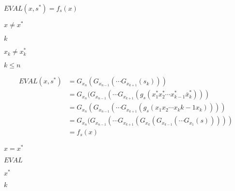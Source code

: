 \documentclass[10pt]{book}
\begin{document}
\begin{mdSnippets}
\begin{mdInlineSnippet}[316d1c336ee1b8a5227dff5113db0220]%
$EVAL(x,s^*) = f_s(x)$\end{mdInlineSnippet}%
\begin{mdInlineSnippet}[c9233e03983076893b8ac6591e0638d1]%
$x \neq x^*$\end{mdInlineSnippet}%
\begin{mdInlineSnippet}[8ce4b16b22b58894aa86c421e8759df3]%
$k$\end{mdInlineSnippet}%
\begin{mdInlineSnippet}[91d5297fa3c7debfef111890800ba071]%
$x_k \neq x_k^*$\end{mdInlineSnippet}%
\begin{mdInlineSnippet}%
$k \leq n$\end{mdInlineSnippet}%
\begin{mdDisplaySnippet}[8943649f6be04889c1cecd58ee8f9af3]%
\[%
\begin{aligned}
EVAL(x,s^*) &= G_{x_{n}}(G_{x_{n-1}}(\cdots G_{x_{k+1}}(s_k))) \\
&= G_{x_{n}}(G_{x_{n-1}}(\cdots G_{x_{k+1}}(g_s(x_1^*x_2^*\cdots x_{k-1}^*\bar{x}_k^*))) \\
&= G_{x_{n}}(G_{x_{n-1}}(\cdots G_{x_{k+1}}(g_s(x_1x_2\cdots x_k{k-1}x_{k})))) \\
&= G_{x_{n}}(G_{x_{n-1}}(\cdots G_{x_{k+1}}(G_{x_k}(G_{x_{k-1}}(\cdots G_{x_1}(s))))) \\
&= f_s(x)
\end{aligned}
\]%
\end{mdDisplaySnippet}%
\begin{mdInlineSnippet}[8113e236a321599b97c88324bb4a3556]%
$x = x^*$\end{mdInlineSnippet}%
\begin{mdInlineSnippet}[1f8cb46fe06733d6f0dd650117e6ab66]%
$EVAL$\end{mdInlineSnippet}%
\begin{mdInlineSnippet}[5d9075efa0ec4b2e8228505844f11742]%
$x^*$\end{mdInlineSnippet}%
\begin{mdInlineSnippet}[8ce4b16b22b58894aa86c421e8759df3]%
$k$\end{mdInlineSnippet}%

\end{mdSnippets}
\end{document}
